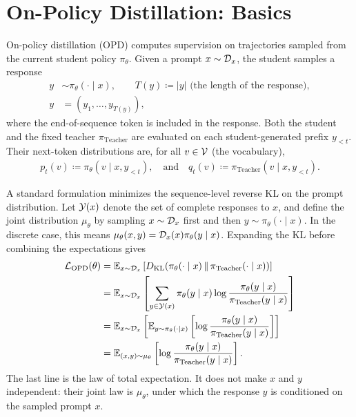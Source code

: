 \section{On-Policy Distillation: Basics}
\label{sec:on-policy-distillation-basics}

On-policy distillation (OPD) computes supervision on trajectories sampled from
the current student policy $\pi_\theta$. Given a prompt $x\sim{\cal D}_x$, the
student samples a response
\begin{align*}
    y &\sim \pi_\theta(\cdot\mid x),
    \qquad T(y) \coloneqq |y| \text{ (the length of the response)},\\
    y &= (y_1,\ldots,y_{T(y)}),
\end{align*}
where the end-of-sequence token is included in the response. Both the student
and the fixed teacher $\pi_{\mathrm{Teacher}}$ are evaluated on each
student-generated prefix $y_{<t}$. Their next-token distributions are, for all $v\in{\cal V}$ (the vocabulary),
\begin{align*}
    p_t(v)
    \coloneqq \pi_\theta(v\mid x,y_{<t}),
    \quad\text{and}\quad
    q_t(v)
    \coloneqq \pi_{\mathrm{Teacher}}(v\mid x,y_{<t}).
\end{align*}

A standard formulation minimizes the sequence-level reverse KL on the prompt
distribution. Let ${\cal Y}(x)$ denote the set of complete responses to $x$, and
define the joint distribution $\mu_\theta$ by sampling
$x\sim{\cal D}_x$ first and then $y\sim\pi_\theta(\cdot\mid x)$. In the discrete
case, this means
$\mu_\theta(x,y)={\cal D}_x(x)\pi_\theta(y\mid x)$. Expanding the KL before
combining the expectations gives
\begin{align}
    {\cal L}_{\mathrm{OPD}}(\theta)
    &=
    \mathbb{E}_{x\sim{\cal D}_x}
    \left[
        D_{\mathrm{KL}}\!\left(
            \pi_\theta(\cdot\mid x)
            \,\middle\|\,
            \pi_{\mathrm{Teacher}}(\cdot\mid x)
        \right)
    \right]
    \nonumber\\
    &=
    \mathbb{E}_{x\sim{\cal D}_x}
    \left[
        \sum_{y\in{\cal Y}(x)}
        \pi_\theta(y\mid x)
        \log\frac{\pi_\theta(y\mid x)}
                 {\pi_{\mathrm{Teacher}}(y\mid x)}
    \right]
    \nonumber\\
    &=
    \mathbb{E}_{x\sim{\cal D}_x}
    \left[
        \mathbb{E}_{y\sim\pi_\theta(\cdot\mid x)}
        \left[
            \log\frac{\pi_\theta(y\mid x)}
                     {\pi_{\mathrm{Teacher}}(y\mid x)}
        \right]
    \right]
    \nonumber\\
    &=
    \mathbb{E}_{(x,y)\sim\mu_\theta}
    \left[
        \log\frac{\pi_\theta(y\mid x)}
                 {\pi_{\mathrm{Teacher}}(y\mid x)}
    \right].
    \label{eq:opd.sequence-kl}
\end{align}
The last line is the law of total expectation. It does not make $x$ and $y$
independent: their joint law is $\mu_\theta$, under which the response $y$ is
conditioned on the sampled prompt $x$.


